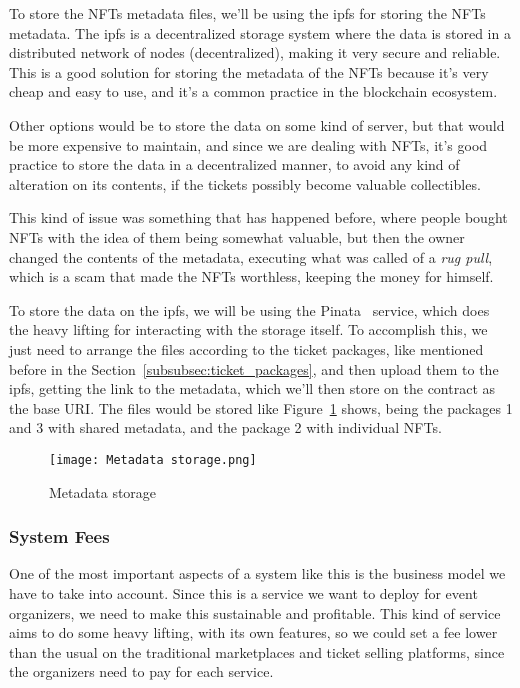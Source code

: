 To store the NFTs metadata files, we'll be using the \gls{ipfs} for storing the
NFTs metadata. The \gls{ipfs} is a decentralized storage system where the data
is stored in a distributed network of nodes (decentralized), making it very
secure and reliable. This is a good solution for storing the metadata of the
NFTs because it's very cheap and easy to use, and it's a common practice in the
blockchain ecosystem.

Other options would be to store the data on some kind of server, but that would
be more expensive to maintain, and since we are dealing with NFTs, it's good
practice to store the data in a decentralized manner, to avoid any kind of
alteration on its contents, if the tickets possibly become valuable
collectibles.

This kind of issue was something that has happened before, where people bought
NFTs with the idea of them being somewhat valuable, but then the owner changed
the contents of the metadata, executing what was called of a \textit{rug pull},
which is a scam that made the NFTs worthless, keeping the money for himself.

To store the data on the \gls{ipfs}, we will be using the Pinata~\cite{pinata}
service, which does the heavy lifting for interacting with the storage itself.
To accomplish this, we just need to arrange the files according to the ticket
packages, like mentioned before in the Section~\ref{subsubsec:ticket_packages},
and then upload them to the \gls{ipfs}, getting the link to the metadata, which
we'll then store on the contract as the base URI. The files would be stored
like Figure~\ref{fig:metadata_storage} shows, being the packages 1 and 3 with
shared metadata, and the package 2 with individual NFTs.

\begin{figure}[H]
	\texttt{[image: Metadata storage.png]}
	\centering
	\caption{Metadata storage}\label{fig:metadata_storage}
\end{figure}

\subsubsection{System Fees}\label{subsubsec:system_fees}

One of the most important aspects of a system like this is the business model
we have to take into account. Since this is a service we want to deploy for
event organizers, we need to make this sustainable and profitable. This kind of
service aims to do some heavy lifting, with its own features, so we could set a
fee lower than the usual on the traditional marketplaces and ticket selling
platforms, since the organizers need to pay for each service.

